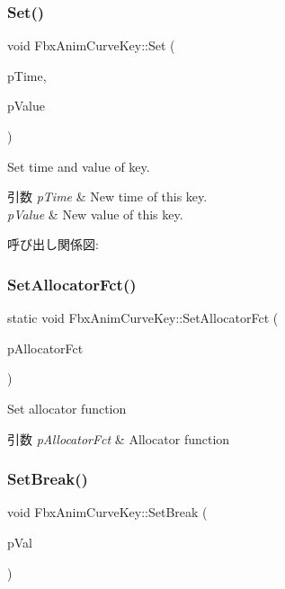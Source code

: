 \subsubsection{\texorpdfstring{Set()}{Set()}}
{\footnotesize\ttfamily void Fbx\+Anim\+Curve\+Key\+::\+Set (\begin{DoxyParamCaption}\item[{\hyperlink{class_fbx_time}{Fbx\+Time}}]{p\+Time,  }\item[{float}]{p\+Value }\end{DoxyParamCaption})}

Set time and value of key. 
\begin{DoxyParams}{引数}
{\em p\+Time} & New time of this key. \\
\hline
{\em p\+Value} & New value of this key. \\
\hline
\end{DoxyParams}
呼び出し関係図\+:
\mbox{\label{class_fbx_anim_curve_key_afa4c2dc0dd61a5f1bf28a1463b3ac859}} 
\subsubsection{\texorpdfstring{Set\+Allocator\+Fct()}{SetAllocatorFct()}}
{\footnotesize\ttfamily static void Fbx\+Anim\+Curve\+Key\+::\+Set\+Allocator\+Fct (\begin{DoxyParamCaption}\item[{\hyperlink{class_fbx_anim_curve_key___impl}{Fbx\+Anim\+Curve\+Key\+\_\+\+Impl} $\ast$($\ast$)()}]{p\+Allocator\+Fct }\end{DoxyParamCaption})\hspace{0.3cm}{\ttfamily [static]}}

Set allocator function 
\begin{DoxyParams}{引数}
{\em p\+Allocator\+Fct} & Allocator function \\
\hline
\end{DoxyParams}
\mbox{\label{class_fbx_anim_curve_key_a688bc80bc9b18052f8bc078293fba426}} 
\subsubsection{\texorpdfstring{Set\+Break()}{SetBreak()}}
{\footnotesize\ttfamily void Fbx\+Anim\+Curve\+Key\+::\+Set\+Break (\begin{DoxyParamCaption}\item[{bool}]{p\+Val }\end{DoxyParamCaption})}


